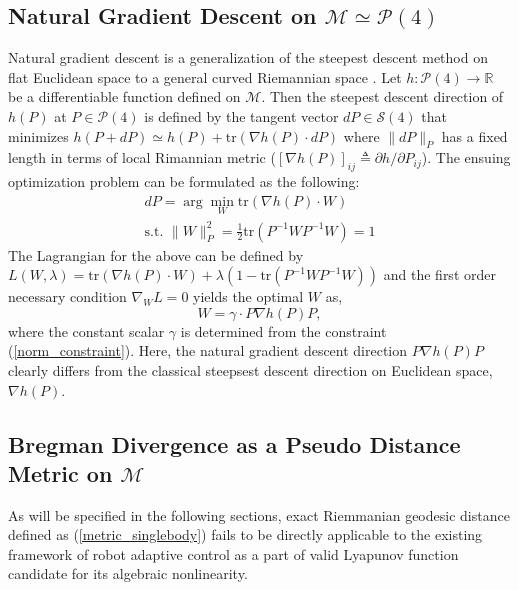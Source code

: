 \documentclass[letterpaper, 10 pt, conference]{ieeeconf}  %
\begin{document}
\subsection{Natural Gradient Descent on $\mathcal{M}\simeq \mathcal{P}(4)$}
Natural gradient descent is a generalization of the steepest descent method on flat Euclidean space to a general curved Riemannian space \cite{Amari_Naturalgrad}. Let $h : \mathcal{P}(4) \rightarrow \mathbb{R}$ be a differentiable function defined on $\mathcal{M}$. Then the steepest descent direction of $h(P)$ at $P\in\mathcal{P}(4)$ is defined by the tangent vector $dP\in\mathcal{S}(4)$ that minimizes $h(P+dP) \simeq h(P) + \mathrm{tr}(\nabla h(P)\cdot dP)$ where $\|dP\|_{P}$ has a fixed length in terms of local Rimannian metric ($[\nabla h(P)]_{ij} \triangleq \partial h/\partial P_{ij}$). The ensuing optimization problem can be formulated as the following:
\begin{gather}
dP = \arg\min_{W} \mathrm{tr}(\nabla h(P)\cdot W) \\
 \text{s.t. } \|W\|_{P}^2= \frac{1}{2}\mathrm{tr}(P^{-1}WP^{-1}W) = 1 \label{norm_constraint}
\end{gather}
The Lagrangian for the above can be defined by $L(W, \lambda) = \mathrm{tr}(\nabla h(P)\cdot W) + \lambda(1- \mathrm{tr}(P^{-1}WP^{-1}W))$ and the first order necessary condition $\nabla_{W}L = 0$ yields the optimal $W$ as,
\begin{equation}
W = \gamma \cdot P\nabla h(P) P, \label{natural_gradient_direction}
\end{equation}
where the constant scalar $\gamma$ is determined from the constraint (\ref{norm_constraint}). Here, the natural gradient descent direction $P\nabla h(P) P$ clearly differs from the classical steepsest descent direction on Euclidean space, $\nabla h(P)$.

\subsection{Bregman Divergence as a Pseudo Distance Metric on $\mathcal{M}$}
As will be specified in the following sections, exact Riemmanian geodesic distance defined as (\ref{metric_singlebody}) fails to be directly applicable to the existing framework of robot adaptive control as a part of valid Lyapunov function candidate for its algebraic nonlinearity.
\end{document}
